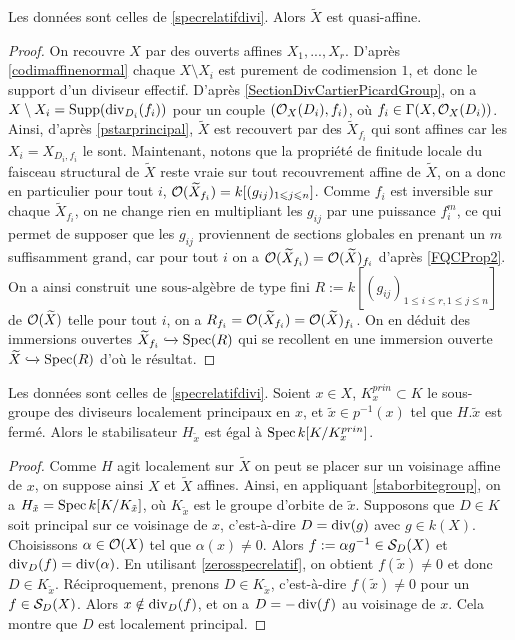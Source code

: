 \begin{cor}\label{specrelatifQuasiAff}
Les données sont celles de \ref{specrelatifdivi}. Alors $\widetilde{X}$ est quasi-affine.
\end{cor}
\begin{proof}
On recouvre $X$ par des ouverts affines $X_1,...,X_r$. D'après \ref{codimaffinenormal} chaque $X\setminus X_i$ est purement de codimension $1$, et donc le support d'un diviseur effectif. D'après \ref{SectionDivCartierPicardGroup}, on a $X\setminus X_i=\operatorname{Supp}(\operatorname{div}_{D_i}(f_i))$ pour un couple $(\mathcal{O}_X(D_i),f_i)$, où $f_i\in\Gamma(X,\mathcal{O}_X(D_i))$. Ainsi, d'après \ref{pstarprincipal}, $\widetilde{X}$ est recouvert par des $\widetilde{X}_{f_i}$ qui sont affines car les $X_i=X_{D_i,f_i}$ le sont. Maintenant, notons que la propriété de finitude locale du faisceau structural de $\widetilde{X}$ reste vraie sur tout recouvrement affine de $\widetilde{X}$, on a donc en particulier pour tout $i$, $\mathcal{O}(\widetilde{X}_{f_i})=k[(g_{ij})_{1\leqslant j\leqslant n}]$. Comme $f_i$ est inversible sur chaque $\widetilde{X}_{f_i}$, on ne change rien en multipliant les $g_{ij}$ par une puissance $f_i^m$, ce qui permet de supposer que les $g_{ij}$ proviennent de sections globales en prenant un $m$ suffisamment grand, car pour tout $i$ on a $\mathcal{O}({\widetilde{X}_{f_i}})=\mathcal{O}({\widetilde{X}})_{f_i}$ d'après \ref{FQCProp2}. On a ainsi construit une sous-algèbre de type fini $R:=k[(g_{ij})_{1\leq i\leq r, 1\leq j\leq n}]$ de $\mathcal{O}(\widetilde{X})$ telle pour tout $i$, on a $R_{f_i}=\mathcal{O}({\widetilde{X}_{f_i}})=\mathcal{O}({\widetilde{X}})_{f_i}$. On en déduit des immersions ouvertes $\widetilde{X}_{f_i}\xhookrightarrow{} \operatorname{Spec}(R)$ qui se recollent en une immersion ouverte $\widetilde{X}\xhookrightarrow{} \operatorname{Spec}(R)$ d'où le résultat.
\end{proof}

\begin{cor}
Les données sont celles de \ref{specrelatifdivi}. Soient $x\in X$, $K_x^{prin}\subset K$ le sous-groupe des diviseurs localement principaux en $x$, et $\tilde{x}\in p^{-1}(x)$ tel que $H.\tilde{x}$ est fermé. Alors le stabilisateur $H_{\tilde{x}}$ est égal à $\operatorname{Spec} k[K/K_x^{prin}]$.
\end{cor}
\begin{proof}
Comme $H$ agit localement sur $\widetilde{X}$ on peut se placer sur un voisinage affine de $x$, on suppose ainsi $X$ et $\widetilde{X}$ affines. Ainsi, en appliquant \ref{staborbitegroup}, on a $H_{\tilde{x}}=\operatorname{Spec} k[K/K_{\tilde{x}}]$, où $K_{\tilde{x}}$ est le groupe d'orbite de $\tilde{x}$. Supposons que $D\in K$ soit principal sur ce voisinage de $x$, c'est-à-dire $D=\operatorname{div}(g)$ avec $g\in k(X)$. Choisissons $\alpha \in \mathcal{O}(X)$ tel que $\alpha(x)\neq 0$. Alors $f:=\alpha g^{-1}\in \mathcal{S}_D(X)$ et $\operatorname{div}_D(f)=\operatorname{div}(\alpha)$. En utilisant \ref{zerosspecrelatif}, on obtient $f(\tilde{x})\neq 0$ et donc $D\in K_{\tilde{x}}$. Réciproquement, prenons $D\in K_{\tilde{x}}$, c'est-à-dire $f(\tilde{x})\neq 0$ pour un $f\in \mathcal{S}_D(X)$. Alors $x\notin \operatorname{div}_D(f)$, et on a $D=-\operatorname{div}(f)$ au voisinage de $x$. Cela montre que $D$ est localement principal.
\end{proof}





